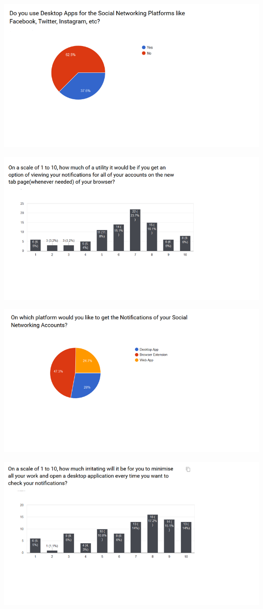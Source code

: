 \documentclass[12pt]{article}
\begin{document}
  \includegraphics[width=\linewidth]{srs8.png}
  
  \includegraphics[width=\linewidth]{srs9.png}
  
  \includegraphics[width=\linewidth]{srs10.png}
  
  \includegraphics[width=\linewidth]{srs11.png}
  
\end{document}
